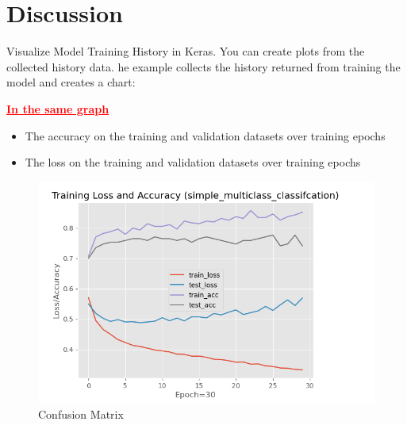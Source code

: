 \section{Discussion}
\label{chap:discussion}

Visualize Model Training History in Keras.
You can create plots from the collected history data.
he example collects the history returned from training the model and creates a chart:
         
\hspace{2cm} \textbf{\textcolor{red}{\Large\underline{In the same graph}}}
\begin{itemize}
    \item The accuracy on the training and validation datasets over training epochs
    \item  The loss on the training and validation datasets over training epochs 
\end{itemize}
\newpage
\begin{figure}[htp]
    \centering
    \includegraphics[width=1.2\textwidth]{images/graph.png}
    \caption{Confusion Matrix }
    \label{fig:example}
\end{figure}




